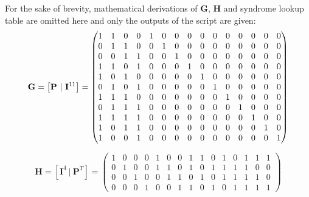 For the sake of brevity, mathematical derivations of $\mathbf G$, $\mathbf H$ and syndrome lookup table are omitted here and only the outputs of the script are given:
\begin{equation}
\setcounter{MaxMatrixCols}{20}
	\mathbf G = \left[ \mathbf P ~ | ~ \mathbf I^{11} \right] = \begin{pmatrix}
1 & 1 & 0 & 0 & 1 & 0 & 0 & 0 & 0 & 0 & 0 & 0 & 0 & 0 & 0 \\
0 & 1 & 1 & 0 & 0 & 1 & 0 & 0 & 0 & 0 & 0 & 0 & 0 & 0 & 0 \\ 
0 & 0 & 1 & 1 & 0 & 0 & 1 & 0 & 0 & 0 & 0 & 0 & 0 & 0 & 0 \\ 
1 & 1 & 0 & 1 & 0 & 0 & 0 & 1 & 0 & 0 & 0 & 0 & 0 & 0 & 0 \\ 
1 & 0 & 1 & 0 & 0 & 0 & 0 & 0 & 1 & 0 & 0 & 0 & 0 & 0 & 0 \\ 
0 & 1 & 0 & 1 & 0 & 0 & 0 & 0 & 0 & 1 & 0 & 0 & 0 & 0 & 0 \\ 
1 & 1 & 1 & 0 & 0 & 0 & 0 & 0 & 0 & 0 & 1 & 0 & 0 & 0 & 0 \\ 
0 & 1 & 1 & 1 & 0 & 0 & 0 & 0 & 0 & 0 & 0 & 1 & 0 & 0 & 0 \\ 
1 & 1 & 1 & 1 & 0 & 0 & 0 & 0 & 0 & 0 & 0 & 0 & 1 & 0 & 0 \\ 
1 & 0 & 1 & 1 & 0 & 0 & 0 & 0 & 0 & 0 & 0 & 0 & 0 & 1 & 0 \\ 
1 & 0 & 0 & 1 & 0 & 0 & 0 & 0 & 0 & 0 & 0 & 0 & 0 & 0 & 1
\end{pmatrix}
\end{equation}

\begin{equation}
	\mathbf H = \left[ \mathbf I^4 ~ | ~ \mathbf P^T \right] = \begin{pmatrix}
1 & 0 & 0 & 0 & 1 & 0 & 0 & 1 & 1 & 0 & 1 & 0 & 1 & 1 & 1 \\ 
0 & 1 & 0 & 0 & 1 & 1 & 0 & 1 & 0 & 1 & 1 & 1 & 1 & 0 & 0 \\ 
0 & 0 & 1 & 0 & 0 & 1 & 1 & 0 & 1 & 0 & 1 & 1 & 1 & 1 & 0 \\ 
0 & 0 & 0 & 1 & 0 & 0 & 1 & 1 & 0 & 1 & 0 & 1 & 1 & 1 & 1
\end{pmatrix}
\end{equation}

